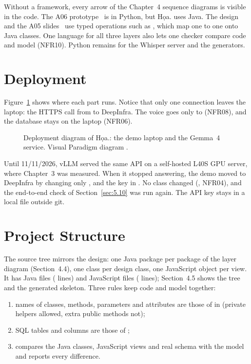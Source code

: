 Without a framework, every arrow of the Chapter~4 sequence diagrams is visible in the code. The A06
prototype~\cite{slidesA06} is in Python, but Họa. uses Java. The design and the A05 slides~\cite{slidesL05} use typed
operations such as , which map one to one onto Java classes. One
language for all three layers also lets one checker compare code and model (NFR10). Python remains for the Whisper
server and the generators.

\section{Deployment}\label{sec:5.2}

Figure~\ref{fig:c5_deployment} shows where each part runs. Notice that only one connection leaves the laptop: the
HTTPS call from  to DeepInfra. The voice goes only to  (NFR08), and the database stays on the laptop
(NFR06).

\begin{figure}[H]
\centering
{}
\caption[Deployment diagram of Họa.]{Deployment diagram of Họa.: the demo laptop and the Gemma~4 service. Visual Paradigm diagram .}\label{fig:c5_deployment}
\end{figure}

Until 11/11/2026, vLLM served the same API on a self-hosted L40S GPU server, where Chapter~3 was measured. When it
stopped answering, the demo moved to DeepInfra by changing only ,  and the key
in . No class changed (, NFR04), and the end-to-end check of
Section~\ref{sec:5.10} was run again. The API key stays in a local file outside git.

\section{Project Structure}\label{sec:5.3}

The source tree mirrors the design: one Java package per package of the layer diagram (Section~4.4), one class per
design class, one JavaScript object per view. It has \javaFileCount{} Java files (\javaLineCount{} lines) and
\jsFileCount{} JavaScript files (\jsLineCount{} lines); Section~4.5 shows the tree and the generated skeleton. Three
rules keep code and model together:
\begin{enumerate}
\item names of classes, methods, parameters and attributes are those of  in 
      (private helpers allowed, extra public methods not);
\item SQL tables and columns are those of ;
\item {} compares the Java classes, JavaScript views and real schema with the model and
      reports every difference.
\end{enumerate}

